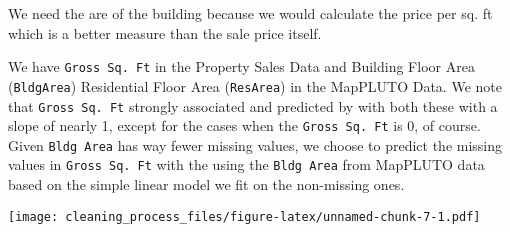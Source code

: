 \documentclass[]{article}
\newenvironment{Shaded}{\begin{snugshade}}{\end{snugshade}}
\newcommand{\DataTypeTok}[1]{\textcolor[rgb]{0.13,0.29,0.53}{#1}}
\newcommand{\DecValTok}[1]{\textcolor[rgb]{0.00,0.00,0.81}{#1}}
\newcommand{\KeywordTok}[1]{\textcolor[rgb]{0.13,0.29,0.53}{\textbf{#1}}}
\newcommand{\NormalTok}[1]{#1}
\newcommand{\OperatorTok}[1]{\textcolor[rgb]{0.81,0.36,0.00}{\textbf{#1}}}
\newcommand{\StringTok}[1]{\textcolor[rgb]{0.31,0.60,0.02}{#1}}
\begin{document}
We need the are of the building because we would calculate the price per
sq. ft which is a better measure than the sale price itself.

We have \texttt{Gross\ Sq.\ Ft} in the Property Sales Data and Building
Floor Area (\texttt{BldgArea}) Residential Floor Area (\texttt{ResArea})
in the MapPLUTO Data. We note that \texttt{Gross\ Sq.\ Ft} strongly
associated and predicted by with both these with a slope of nearly 1,
except for the cases when the \texttt{Gross\ Sq.\ Ft} is 0, of course.
Given \texttt{Bldg\ Area} has way fewer missing values, we choose to
predict the missing values in \texttt{Gross\ Sq.\ Ft} with the using the
\texttt{Bldg\ Area} from MapPLUTO data based on the simple linear model
we fit on the non-missing ones.

\begin{Shaded}
\end{Shaded}

\texttt{[image: cleaning\_process\_files/figure-latex/unnamed-chunk-7-1.pdf]}
\end{document}
